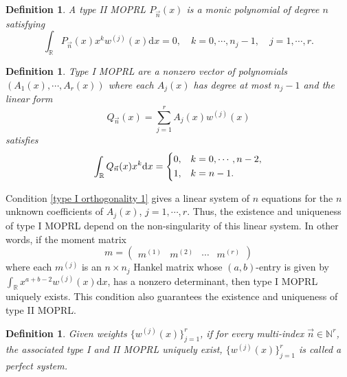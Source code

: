\documentclass[a4paper,10pt,leqno]{amsart}
\numberwithin{equation}{section}
\newtheorem{definition}[theorem]{Definition}
\theoremstyle{remark}
\newcommand{\dd}{\mathrm{d}}
\newcommand{\R}{\mathbb{R}}
\begin{document}
\begin{definition} \label{defn of type II}
A type II MOPRL $P_{\vec{n}}(x)$ is a monic polynomial of degree $n$ satisfying
\begin{equation} \label{type II orthogonality}
	\int_{\R} P_{\vec{n}}(x) x^k w^{(j)}(x) \dd x = 0, \quad k=0, \cdots, n_j-1, \quad j=1, \cdots, r.
\end{equation}
\end{definition}

\begin{definition} \label{defn of type I}
Type I MOPRL are a nonzero vector of polynomials $(A_1(x), \cdots, A_r(x))$ where each $A_j(x)$ has degree at most $n_j-1$ and the linear form 
\[
Q_{\vec{n}}(x) = \sum_{j=1}^r A_j(x) w^{(j)}(x)
\]
satisfies
\begin{equation} \label{type I orthogonality 1}
\int_{\R} Q_{\vec{n}}(x) x^k \dd x = 
\begin{dcases}
    0, & k = 0, \cdots, n-2,\\
    1, & k = n-1.
\end{dcases}
\end{equation}
\end{definition}

Condition \eqref{type I orthogonality 1} gives a linear system of $n$ equations for the $n$ unknown coefficients of $A_j(x)$, $j=1, \cdots, r$.
Thus, the existence and uniqueness of type I MOPRL depend on the non-singularity of this linear system. 
In other words, if the moment matrix 
\[
m = \begin{pmatrix}
    m^{(1)} & m^{(2)} & \cdots & m^{(r)}
\end{pmatrix}
\]
where each $m^{(j)}$ is an $n \times n_j$ Hankel matrix whose $(a,b)$-entry is given by $\int_\R x^{a + b - 2} w^{(j)}(x) \dd x$, has a nonzero determinant, then type I MOPRL uniquely exists. This condition also guarantees the existence and uniqueness of type II MOPRL.

\begin{definition}
Given weights $\{w^{(j)}(x)\}_{j=1}^r$, if for every multi-index $\vec{n}\in\mathbb{N}^r$, the associated type I and II MOPRL uniquely exist, $\{w^{(j)}(x)\}_{j=1}^r$ is called a perfect system.
\end{definition}
\end{document}
